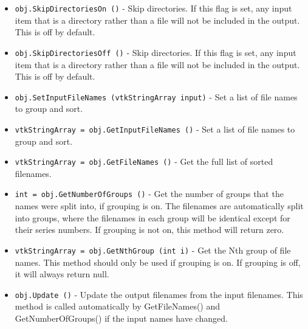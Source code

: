 \begin{itemize}
\item  \verb|obj.SkipDirectoriesOn ()| -  Skip directories. If this flag is set, any input item that
 is a directory rather than a file will not be included in
 the output.  This is off by default.

\item  \verb|obj.SkipDirectoriesOff ()| -  Skip directories. If this flag is set, any input item that
 is a directory rather than a file will not be included in
 the output.  This is off by default.

\item  \verb|obj.SetInputFileNames (vtkStringArray input)| -  Set a list of file names to group and sort.

\item  \verb|vtkStringArray = obj.GetInputFileNames ()| -  Set a list of file names to group and sort.

\item  \verb|vtkStringArray = obj.GetFileNames ()| -  Get the full list of sorted filenames.

\item  \verb|int = obj.GetNumberOfGroups ()| -  Get the number of groups that the names were split into, if
 grouping is on.  The filenames are automatically split into
 groups, where the filenames in each group will be identical
 except for their series numbers.  If grouping is not on, this
 method will return zero.

\item  \verb|vtkStringArray = obj.GetNthGroup (int i)| -  Get the Nth group of file names.  This method should only
 be used if grouping is on.  If grouping is off, it will always
 return null.

\item  \verb|obj.Update ()| -  Update the output filenames from the input filenames.
 This method is called automatically by GetFileNames()
 and GetNumberOfGroups() if the input names have changed.

\end{itemize}
